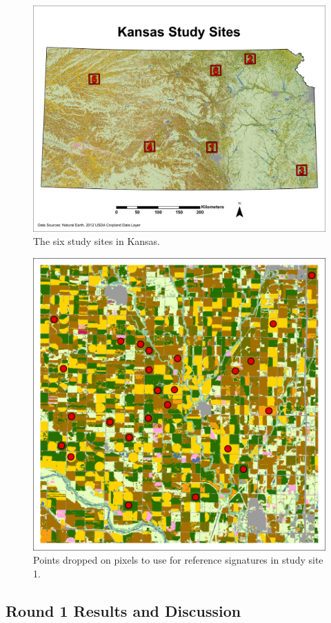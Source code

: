 \begin{figure}
  \centering
  \includegraphics[width=.9\textwidth]{Graphics/Testing/STUDYSITES.pdf}
  \caption{The six study sites in Kansas.}
  \label{fig:studysites}
\end{figure}

\begin{figure}
  \centering
  \includegraphics[width=.7\textwidth]{Graphics/Testing/clip1_30mCDL_smpl_old.pdf}
  \caption{Points dropped on pixels to use for reference signatures in study site 1.}
  \label{fig:refpoints}
\end{figure}

\subsection*{Round 1 Results and Discussion}

